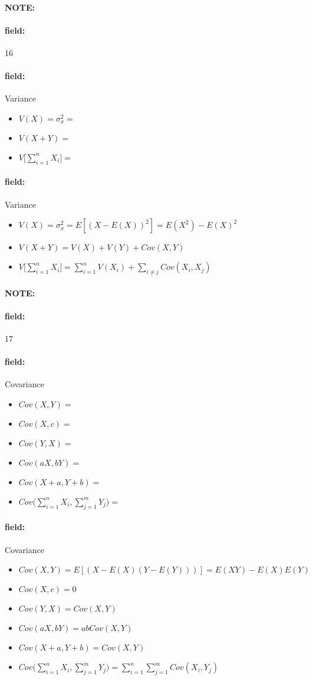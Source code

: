 \documentclass[12pt]{article}
\newenvironment{note}{\paragraph{NOTE:}}{}
\newenvironment{field}{\paragraph{field:}}{}
\begin{document}
\begin{note}
  \begin{field}
    \tiny 16
  \end{field}
  \begin{field}
    Variance
    \begin{itemize}
      \item $V(X) = \sigma_x^2 = $
      \item $V(X+Y) =$
      \item $V\bigg[\sum_{i=1}^n X_i\bigg] = $
    \end{itemize}
  \end{field}
  \begin{field}
    Variance
    \begin{itemize}
      \item $V(X) = \sigma_x^2 = E[(X - E(X))^2] = E(X^2) - E(X)^2$
      \item $V(X+Y) = V(X) + V(Y) + Cov(X,Y)$
      \item $V\bigg[\sum_{i=1}^n X_i\bigg] = \sum_{i=1}^n V(X_i) + \sum_{i\neq j} Cov(X_i,X_j)$
    \end{itemize}
  \end{field}
\end{note}








\begin{note}
  \begin{field}
    \tiny 17
  \end{field}
  \begin{field}
    Covariance
    \begin{itemize}
      \item $Cov(X,Y) = $
      \item $Cov(X,c) = $
      \item $Cov(Y,X) = $
      \item $Cov(aX,bY) =$
      \item $Cov(X + a, Y + b) =$
      \item $Cov\bigg(\sum_{i=1}^n X_i, \sum_{j=1}^m Y_j\bigg) = $
    \end{itemize}
  \end{field}
  \begin{field}
    Covariance
    \begin{itemize}
      \item $Cov(X,Y) = E[(X - E(X)(Y - E(Y)))] = E(XY) - E(X)E(Y)$
      \item $Cov(X,c) = 0$
      \item $Cov(Y,X) = Cov(X,Y)$
      \item $Cov(aX,bY) = abCov(X,Y)$
      \item $Cov(X + a, Y + b) = Cov(X,Y)$
      \item $Cov\bigg(\sum_{i=1}^n X_i, \sum_{j=1}^m Y_j\bigg) = \sum_{i=1}^n \sum_{j=1}^m Cov(X_i,Y_j)$
    \end{itemize}
  \end{field}
\end{note}
\end{document}
